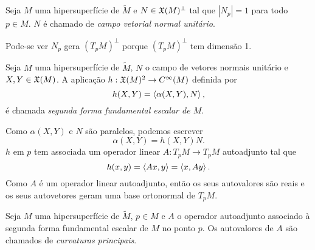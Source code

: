 \begin{definicao}
	Seja $M$ uma hipersuperfície de $\tilde{M}$ e
	$N \in \mathfrak{X}(M)^\perp$ tal que $|N_p|=1$ para todo $p \in M$.
	$N$ é chamado de \emph{campo vetorial normal unitário}.
\end{definicao}

Pode-se ver $N_p$ gera $\left(T_p M\right)^\perp$ porque $\left(T_p M\right)^\perp$ tem dimensão 1.

\begin{definicao}
	Seja $M$ uma hipersuperfície de $\tilde{M}$,
	$N$ o campo de vetores normais unitário e
	$X,Y \in \mathfrak{X}(M)$.
	A aplicação $h: \mathfrak{X}(M)^2 \rightarrow C^\infty(M)$ definida por
	\begin{equation*}
	h(X,Y) = \left\langle \alpha(X,Y),N \right\rangle,
	\end{equation*}
	é chamada \emph{segunda forma fundamental escalar de $M$}.
\end{definicao}
	Como $\alpha(X,Y)$ e $N$ são paralelos, podemos escrever
	\begin{equation*}
	\alpha(X,Y) = h(X,Y) N.
	\end{equation*}
$h$ em $p$ tem associada um operador linear $A: T_p M \rightarrow T_p M$ autoadjunto tal que
	\begin{equation*}
	h(x,y) = \left\langle Ax,y \right\rangle = \left\langle x,Ay \right\rangle.
	\end{equation*}
	Como $A$ é um operador linear autoadjunto, então os seus autovalores são reais e os seus autovetores geram uma base ortonormal de $T_p M$.

\begin{definicao}
	Seja $M$ uma hipersuperfície de $\tilde{M}$,
	$p \in M$ e
	$A$ o operador autoadjunto associado à segunda forma fundamental escalar de $M$ no ponto $p$.
	Os autovalores de $A$ são chamados de \emph{curvaturas principais}.
\end{definicao}

